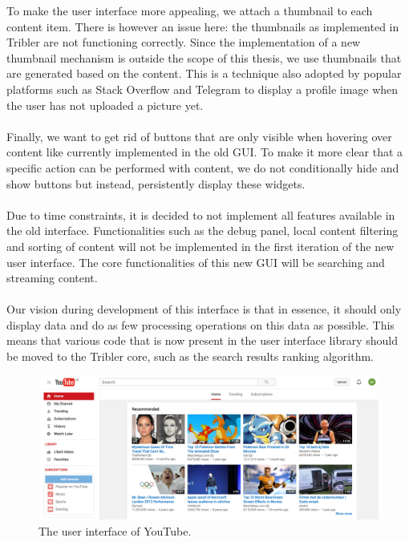 \noindent To make the user interface more appealing, we attach a thumbnail to each content item. There is however an issue here: the thumbnails as implemented in Tribler are not functioning correctly. Since the implementation of a new thumbnail mechanism is outside the scope of this thesis, we use thumbnails that are generated based on the content. This is a technique also adopted by popular platforms such as Stack Overflow and Telegram to display a profile image when the user has not uploaded a picture yet.\\\\
Finally, we want to get rid of buttons that are only visible when hovering over content like currently implemented in the old GUI. To make it more clear that a specific action can be performed with content, we do not conditionally hide and show buttons but instead, persistently display these widgets.\\\\
Due to time constraints, it is decided to not implement all features available in the old interface. Functionalities such as the debug panel, local content filtering and sorting of content will not be implemented in the first iteration of the new user interface. The core functionalities of this new GUI will be searching and streaming content.\\\\
Our vision during development of this interface is that in essence, it should only display data and do as few processing operations on this data as possible. This means that various code that is now present in the user interface library should be moved to the Tribler core, such as the search results ranking algorithm.

\begin{figure}[t]
	\centering
	\includegraphics[width=1.0\columnwidth]{images/implementation/youtube_interface}
	\caption{The user interface of YouTube.}
	\label{fig:youtube-interface}
\end{figure}

